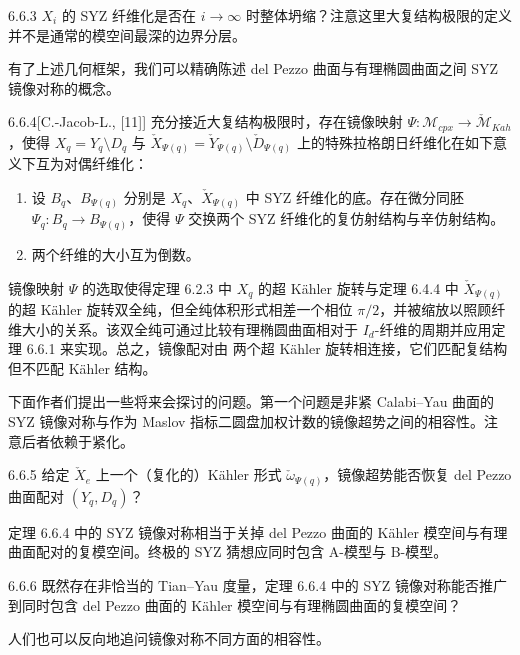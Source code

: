\begin{question}{6.6.3}
$X_i$ 的 SYZ 纤维化是否在 $i\to\infty$ 时整体坍缩？注意这里大复结构极限的定义并不是通常的模空间最深的边界分层。
\end{question}

有了上述几何框架，我们可以精确陈述 del Pezzo 曲面与有理椭圆曲面之间 SYZ 镜像对称的概念。

\begin{theorem}{6.6.4}[{C.-Jacob-L., [11]}]
充分接近大复结构极限时，存在镜像映射 $\Psi:\mathcal{M}_{cpx}\to\check{\mathcal{M}}_{Kah}$，使得 $X_q=Y_q\setminus D_q$ 与 $\check X_{\Psi(q)}=\check Y_{\Psi(q)}\setminus\check D_{\Psi(q)}$ 上的特殊拉格朗日纤维化在如下意义下互为对偶纤维化：
\begin{enumerate}
\item 设 $B_q$、$B_{\Psi(q)}$ 分别是 $X_q$、$\check X_{\Psi(q)}$ 中 SYZ 纤维化的底。存在微分同胚 $\Psi_q:B_q\to B_{\Psi(q)}$，使得 $\Psi$ 交换两个 SYZ 纤维化的复仿射结构与辛仿射结构。
\item 两个纤维的大小互为倒数。
\end{enumerate}
\end{theorem}

镜像映射 $\Psi$ 的选取使得定理 6.2.3 中 $X_q$ 的超 Kähler 旋转与定理 6.4.4 中 $\check X_{\Psi(q)}$ 的超 Kähler 旋转双全纯，但全纯体积形式相差一个相位 $\pi/2$，并被缩放以照顾纤维大小的关系。该双全纯可通过比较有理椭圆曲面相对于 $I_d$-纤维的周期并应用定理 6.6.1 来实现。总之，镜像配对由
两个超 Kähler 旋转相连接，它们匹配复结构但不匹配 Kähler 结构。

下面作者们提出一些将来会探讨的问题。第一个问题是非紧 Calabi--Yau 曲面的 SYZ 镜像对称与作为 Maslov 指标二圆盘加权计数的镜像超势之间的相容性。注意后者依赖于紧化。

\begin{question}{6.6.5}
给定 $\check X_e$ 上一个（复化的）Kähler 形式 $\check\omega_{\Psi(q)}$，镜像超势能否恢复 del Pezzo 曲面配对 $(Y_q,D_q)$？
\end{question}

定理 6.6.4 中的 SYZ 镜像对称相当于关掉 del Pezzo 曲面的 Kähler 模空间与有理曲面配对的复模空间。终极的 SYZ 猜想应同时包含 A-模型与 B-模型。

\begin{question}{6.6.6}
既然存在非恰当的 Tian--Yau 度量，定理 6.6.4 中的 SYZ 镜像对称能否推广到同时包含 del Pezzo 曲面的 Kähler 模空间与有理椭圆曲面的复模空间？
\end{question}

人们也可以反向地追问镜像对称不同方面的相容性。

